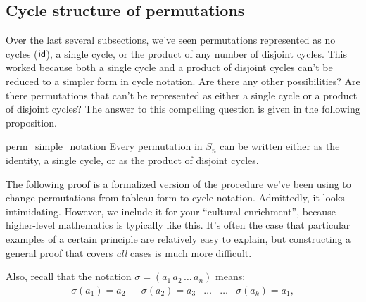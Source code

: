 \subsection{Cycle structure of permutations}

Over the last several subsections, we've seen permutations represented as no cycles (${\sf{i}d}$), a single cycle, or the product of any number of disjoint cycles.  This worked because both a single cycle and a product of disjoint cycles can't be reduced to a simpler form in cycle notation.  Are there any other possibilities?   Are there permutations that can't be represented as either a single cycle or a product of disjoint cycles?  The answer to this compelling question is given in the following proposition. 


\begin{prop}{perm_simple_notation}     
Every permutation in $S_n$ can be written either as the identity, a  single cycle, or as the product of disjoint cycles. 
\end{prop}

\noindent
The following  proof is a formalized version of the procedure we've been using to change permutations from tableau form to cycle notation.
Admittedly, it looks intimidating. However, we include it for your ``cultural enrichment'', because higher-level  mathematics is typically  like this. It's often the case that  particular examples of a certain principle are relatively easy to explain, but constructing a  general proof that covers \emph{all} cases is much more difficult.

\medskip
\noindent
Also, recall  that the notation $\sigma = (a_1 \, a_2 \, \ldots \, a_n)$ means:
\begin{align*}
\sigma( a_1 )  = a_2  & &
\sigma( a_2 )  = a_3 & 
 \ldots   & \ldots & 
\sigma( a_k )  = a_1,
\end{align*}

